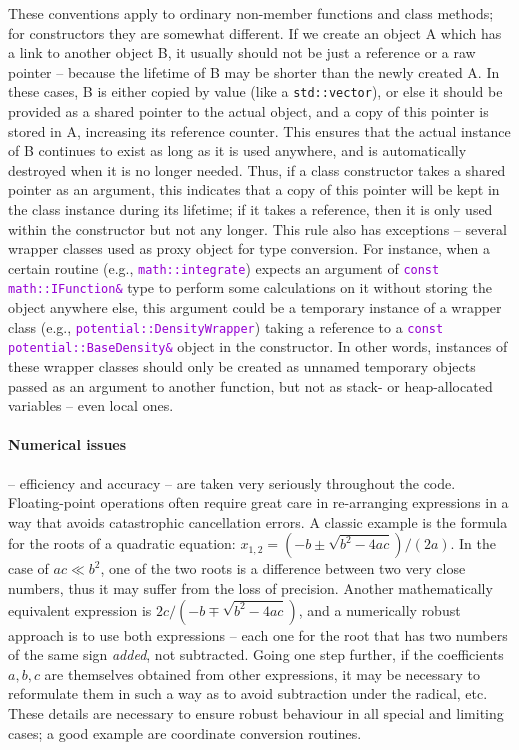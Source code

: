\documentclass[12pt]{article}
\newcommand{\ttt}[1]{\textcolor{darkviolet}{\texttt{#1}}}
\begin{document}
These conventions apply to ordinary non-member functions and class methods; for constructors they are somewhat different. If we create an object A which has a link to another object B, it usually should not be just a reference or a raw pointer -- because the lifetime of B may be shorter than the newly created A. In these cases, B is either copied by value (like a \texttt{std::vector}), or else it should be provided as a shared pointer to the actual object, and a copy of this pointer is stored in A, increasing its reference counter. This ensures that the actual instance of B continues to exist as long as it is used anywhere, and is automatically destroyed when it is no longer needed.
Thus, if a class constructor takes a shared pointer as an argument, this indicates that a copy of this pointer will be kept in the class instance during its lifetime; if it takes a reference, then it is only used within the constructor but not any longer.
This rule also has exceptions -- several wrapper classes used as proxy object for type conversion. For instance, when a certain routine (e.g., \ttt{math::integrate}) expects an argument of \ttt{const math::IFunction\&} type to perform some calculations on it without storing the object anywhere else, this argument could be a temporary instance of a wrapper class (e.g., \ttt{potential::DensityWrapper}) taking a reference to a \ttt{const potential::BaseDensity\&} object in the constructor. In other words, instances of these wrapper classes should only be created as unnamed temporary objects passed as an argument to another function, but not as stack- or heap-allocated variables -- even local ones.

\paragraph{Numerical issues} -- efficiency and accuracy -- are taken very seriously throughout the code. Floating-point operations often require great care in re-arranging expressions in a way that avoids catastrophic cancellation errors. A classic example is the formula for the roots of a quadratic equation: $x_{1,2} = (-b \pm\sqrt{b^2-4ac})/(2a)$. In the case of $ac\ll b^2$, one of the two roots is a difference between two very close numbers, thus it may suffer from the loss of precision. Another mathematically equivalent expression is $2c/(-b \mp\sqrt{b^2-4ac})$, and a numerically robust approach is to use both expressions -- each one for the root that has two numbers of the same sign \textit{added}, not subtracted. Going one step further, if the coefficients $a,b,c$ are themselves obtained from other expressions, it may be necessary to reformulate them in such a way as to avoid subtraction under the radical, etc. These details are necessary to ensure robust behaviour in all special and limiting cases; a good example are coordinate conversion routines.
\end{document}

